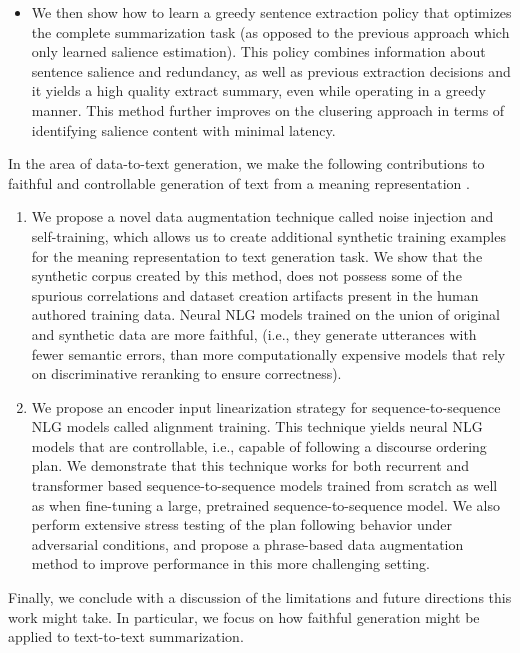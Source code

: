 \begin{enumerate}
\begin{itemize}

\item We then show how to learn a greedy sentence extraction policy that
optimizes the complete summarization task (as opposed to the previous approach
which only learned salience estimation). This policy combines information
about sentence salience and redundancy, as well as previous extraction
decisions and it yields a high quality extract summary, even while operating 
in a greedy manner. This method further improves on the
clusering approach in terms of identifying salience content with minimal
latency.
              \end{itemize}
      \end{enumerate}
  
      In the area of data-to-text generation, we make the following 
      contributions to faithful and controllable generation of 
      text from a meaning representation \citep{kedzie2019,kedzie2020}.  
      \begin{enumerate}
          \item We propose a novel data augmentation technique called 
                noise injection and self-training, which allows us to create
                additional synthetic training examples for the meaning representation to text generation task. We show that the synthetic corpus created by
                this method, does not possess some of the spurious correlations
and dataset creation artifacts present in the human authored training data.
Neural NLG models trained on the union of original and  synthetic data are more faithful, (i.e., they generate utterances with fewer semantic errors, than more computationally expensive models that rely on 
discriminative reranking  to ensure correctness).
\item We propose an encoder input linearization strategy for
sequence-to-sequence NLG models called alignment training.   This technique
yields neural NLG models that are controllable, i.e., capable of following a
discourse ordering plan.  We demonstrate that this technique works for both
recurrent and transformer based sequence-to-sequence models trained from
scratch as well as when fine-tuning a large, pretrained sequence-to-sequence
model. We also perform extensive stress testing of the plan following behavior
under adversarial conditions, and propose a phrase-based data augmentation
method to improve performance in this more challenging setting.
      \end{enumerate}
  
Finally, we conclude with a discussion of the limitations and future
directions this work might take. In particular, we focus on how faithful
generation might be applied to text-to-text summarization. 

